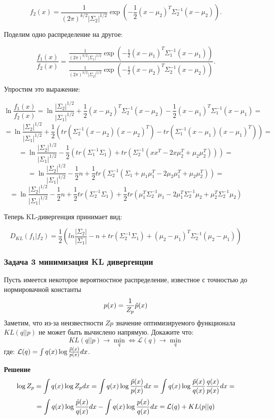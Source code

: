 \[
f_2(x) = \frac{1}{(2\pi)^{k/2} |\Sigma_2|^{1/2}} \exp\left(-\frac{1}{2}(x - \mu_2)^T \Sigma_2^{-1} (x - \mu_2)\right).
\]



Поделим одно распределение на другое:

\[
\frac{f_1(x)}{f_2(x)} = \frac{\frac{1}{(2\pi)^{k/2} |\Sigma_1|^{1/2}} \exp\left(-\frac{1}{2}(x - \mu_1)^T \Sigma_1^{-1} (x - \mu_1)\right)}{\frac{1}{(2\pi)^{k/2} |\Sigma_2|^{1/2}} \exp\left(-\frac{1}{2}(x - \mu_2)^T \Sigma_2^{-1} (x - \mu_2)\right)}.
\]

Упростим это выражение:

\[
\ln \frac{f_1(x)}{f_2(x)} = \ln \frac{|\Sigma_2|^{1/2}}{|\Sigma_1|^{1/2}} + \frac{1}{2}(x - \mu_2)^T \Sigma_2^{-1} (x - \mu_2) - \frac{1}{2}(x - \mu_1)^T \Sigma_1^{-1} (x - \mu_1) =  \]
\[
= \ln \frac{|\Sigma_2|^{1/2}}{|\Sigma_1|^{1/2}} + \frac{1}{2}(tr(\Sigma_2^{-1}(x - \mu_2)(x - \mu_2)^T) - tr(\Sigma_1^{-1}(x - \mu_1)(x - \mu_1)^T)) = 
\]
\[
= \ln \frac{|\Sigma_2|^{1/2}}{|\Sigma_1|^{1/2}} -\frac{1}{2}(tr(\Sigma_1^{-1}\Sigma_1) + tr(\Sigma_2^{-1}(xx^T - 2x \mu_2^T + \mu_2 \mu_2^T))) =
\]
\[
= \ln \frac{|\Sigma_2|^{1/2}}{|\Sigma_1|^{1/2}} -\frac{1}{2}n + \frac{1}{2} tr(\Sigma_2^{-1} (\Sigma_1 + \mu_1 \mu_1^T - 2\mu_2 \mu_1^T + \mu_2 \mu_2 ^T)) = 
\]
\[
 = \ln \frac{|\Sigma_2|^{1/2}}{|\Sigma_1|^{1/2}}  - \frac{1}{2}n  + \frac{1}{2}tr(\Sigma_2^{-1}\Sigma_1) + \frac{1}{2}tr(\mu_1^T \Sigma_2^{-1} \mu_1 - 2\mu_1^T \Sigma_2^{-1} \mu_2 + \mu_2^T\Sigma_2^{-1}\mu_2) 
\]

Теперь KL-дивергенция принимает вид:

\[
D_{KL}(f_1 | f_2) = \frac{1}{2} (ln\frac{|\Sigma_2|}{|\Sigma_1|} - n + tr(\Sigma_2^{-1}\Sigma_1) + (\mu_2 - \mu_1)^T\Sigma_2^{-1}(\mu_2 - \mu_1))
\]

\subsubsection*{Задача 3 минимизация KL дивергенции}
Пусть имеется некоторое вероятностное распределение, известное с точностью до нормировачной константы 
\[p(x) = \frac{1}{Z_p}\Tilde{p}(x) \]
Заметим, что из-за неизвестности $Zp$ значение оптимизируемого
функционала $KL(q||p)$ не может быть вычислено напрямую.
Докажите что: 
\[KL(q||p) \rightarrow \underset{q}{\min} \Leftrightarrow \mathcal{L}(q) \rightarrow \underset{q}{\min}\] 
где: $\mathcal{L}(q) = \int q(x) \log \frac{\Tilde{p}(x)}{p(x)}dx$.


\textbf{Решение}
\[
\log Z_p = \int q(x) \log Z_pdx  = \int q(x) \log \frac{\Tilde{p}(x)}{p(x)}dx = \int q(x) \log \frac{\Tilde{p}(x)}{q(x)}\frac{q(x)}{p(x)}dx
= \]
\[
= \int q(x) \log \frac{\Tilde{p}(x)}{q(x)}dx - \int q(x) \log \frac{p(x)}{q(x)}dx = \mathcal{L}(q) + KL(p||q)
\]

